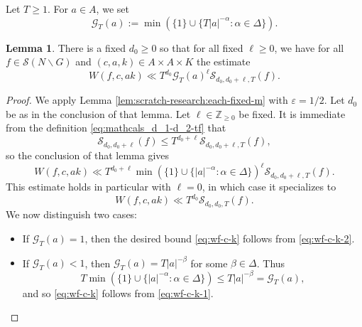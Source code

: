 \documentclass[reqno]{amsart}
\def\eps{\varepsilon}
\theoremstyle{plain} \newtheorem{theorem} {Theorem}
\theoremstyle{definition} \newtheorem{definition} [theorem] {Definition}
\theoremstyle{itplain} %
\newtheorem{lemma}[theorem]{Lemma}
\numberwithin{equation}{section}
\numberwithin{theorem}{section}
\renewcommand{\geq}{\geqslant}
\renewcommand{\leq}{\leqslant}
\begin{document}
Let $T \geq 1$.  For $a \in A$, we set
\begin{equation*}
  \mathcal{G}_T(a) :=
  \min (\{ 1 \} \cup \{ T |a|^{-\alpha} : \alpha \in \Delta \}).
\end{equation*}
\begin{lemma}\label{lem:sub-gln:there-fixed-d_0}
  There is a fixed $d_0 \geq 0$ so that for all fixed $\ell \geq 0$, we have for all $f \in \mathcal{S}(N \backslash G)$ and $(c,a,k) \in A \times  A \times K$ the estimate
\begin{equation}\label{eq:wf-c-k}
  W(f,c,a k) \ll
  T^{d_0} \mathcal{G}_T(a)^{\ell} \mathcal{S}_{d_0, d_0 + \ell, T}(f).
\end{equation}
\end{lemma}
\begin{proof}
  We apply Lemma \ref{lem:scratch-research:each-fixed-m} with $\eps = 1/2$.  Let $d_0$ be as in the conclusion of that lemma.  Let $\ell \in \mathbb{Z}_{\geq 0}$ be fixed.  It is immediate from the definition \eqref{eq:mathcals_d_1-d_2-tf} that
  \begin{equation*}
    \mathcal{S}_{d_0, d_0 + \ell}(f) \leq T^{d_0 + \ell} \mathcal{S}_{d_0, d_0 + \ell, T}(f),
  \end{equation*}
  so the conclusion of that lemma gives
  \begin{equation}\label{eq:wf-c-k-1}
    W(f,c,a k) \ll
    T^{d_0 + \ell}
    \min (\{1\} \cup \{|a|^{-\alpha} : \alpha \in \Delta \})^{\ell} \mathcal{S}_{d_0, d_0 + \ell, T}(f).
  \end{equation}
  This estimate holds in particular with $\ell = 0$, in which case it specializes to
  \begin{equation}\label{eq:wf-c-k-2}
    W(f,c,a k) \ll
    T^{d_0}
    \mathcal{S}_{d_0,d_0,T}(f).
  \end{equation}
  We now distinguish two cases:
  \begin{itemize}
  \item If $\mathcal{G}_T(a) = 1$, then the desired bound \eqref{eq:wf-c-k} follows from \eqref{eq:wf-c-k-2}.
  \item If $\mathcal{G}_T(a) < 1$, then $\mathcal{G}_T(a) = T |a|^{-\beta}$ for some $\beta \in \Delta$.  Thus
    \begin{equation*}
      T
      \min
      (\{1\} \cup \{|a|^{-\alpha} : \alpha \in \Delta \})
      \leq T |a|^{-\beta} = \mathcal{G}_T(a),
    \end{equation*}
    and so \eqref{eq:wf-c-k} follows from \eqref{eq:wf-c-k-1}.
  \end{itemize}
\end{proof}
\end{document}
